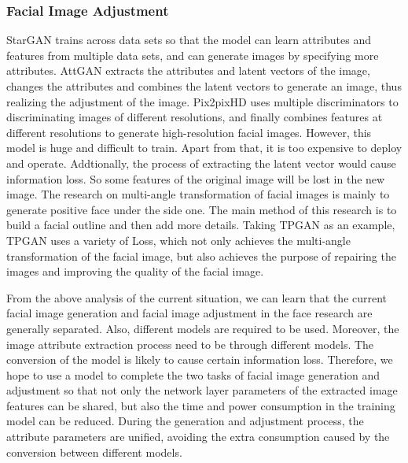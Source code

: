 \subsubsection*{Facial Image Adjustment}
StarGAN trains across data sets so that the model can learn attributes and features from multiple data sets,
    and can generate images by specifying more attributes.
AttGAN extracts the attributes and latent vectors of the image,
    changes the attributes and combines the latent vectors to generate an image,
    thus realizing the adjustment of the image.
Pix2pixHD uses multiple discriminators to discriminating images of different resolutions,
    and finally combines features at different resolutions to generate high-resolution facial images.
However, this model is huge and difficult to train.
Apart from that, it is too expensive to deploy and operate.
Addtionally, the process of extracting the latent vector would cause information loss.
So some features of the original image will be lost in the new image.
The research on multi-angle transformation of facial images is mainly to generate positive face under the side one.
The main method of this research is to build a facial outline and then add more details.
Taking TPGAN as an example, TPGAN uses a variety of Loss,
    which not only achieves the multi-angle transformation of the facial image,
    but also achieves the purpose of repairing the images and improving the quality of the facial image.

\vspace{3ex}

From the above analysis of the current situation,
    we can learn that the current facial image generation and facial image adjustment in the face research are generally separated.
Also, different models are required to be used.
Moreover, the image attribute extraction process need to be through different models.
The conversion of the model is likely to cause certain information loss.
Therefore, we hope to use a model to complete the two tasks of facial image generation and adjustment so that not only the network layer parameters of the extracted image features can be shared,
    but also the time and power consumption in the training model can be reduced.
During the generation and adjustment process, the attribute parameters are unified,
    avoiding the extra consumption caused by the conversion between different models.